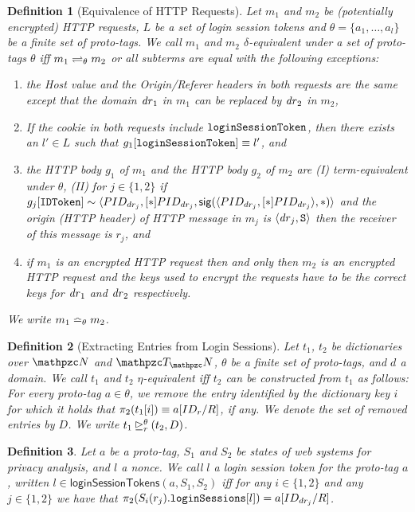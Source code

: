 \documentclass[letterpaper,onecolumn,10pt]{article}
\newtheorem{definition}{Definition}
\begin{document}
\begin{definition}[Equivalence of HTTP Requests]
  Let $m_1$ and $m_2$ be (potentially encrypted) HTTP requests, 
  $L$ be a set of login session tokens and
  $\theta = \{a_1, \ldots, a_l \}$ be a finite set of proto-tags. 
  We call $m_1$ and $m_2$ \emph{$\delta$-equivalent under a set of proto-tags $\theta$} 
  iff $m_1 \prototagequiv{\theta} m_2$ or all subterms are equal with the following exceptions:
  \begin{enumerate}
  \item the Host value and the Origin/Referer headers in both requests
    are the same except that the domain $\mi{dr}_1$ in $m_1$ can be
    replaced by $\mi{dr}_2$ in $m_2$,
  \item If the cookie in both requests include $\str{loginSessionToken}$, 
    then there exists an $l' \in L$ such that $g_1[\str{loginSessionToken}] \equiv l'$, and
  \item the HTTP body $g_1$ of $m_1$ and the HTTP body $g_2$ of $m_2$
    are (I) term-equivalent under $\theta$, 
    (II) for $j\in \{1,2\}$ if
    $g_j[\str{IDToken}] \sim \myangle{PID_{dr_j}, [*]PID_{dr_j}, 
    \sig{\myangle{PID_{dr_j}, [*]PID_{dr_j}}}{*}}$
    and the origin (HTTP header) of HTTP message in $m_j$ is
    $\an{\mi{dr}_j,\https}$ then the receiver of this message is
    $r_j$, and 
  \item if $m_1$ is an encrypted HTTP request then and only then $m_2$
    is an encrypted HTTP request and the keys used to encrypt the
    requests have to be the correct keys for $\mi{dr}_1$ and
    $\mi{dr}_2$ respectively.
  \end{enumerate}
  We write $m_1 \httptagequiv{\theta} m_2$.
\end{definition}

\begin{definition}[Extracting Entries from Login Sessions]
  Let $t_1$, $t_2$ be dictionaries over $\nonces$ and $\terms$,
  $\theta$ be a finite set of proto-tags, and $d$ a domain. We call
  $t_1$ and $t_2$ \emph{$\eta$-equivalent} iff $t_2$ can be
  constructed from $t_1$ as follows: For every proto-tag
  $a \in \theta$, we remove the entry identified by the dictionary key
  $i$ for which it holds that $\proj{2}{t_1[i]} \equiv a[ID_r/ R]$, if
  any. We denote the set of removed entries by $D$. We write
  $\logsessminus{t_1}{t_2}{\theta}{r}{D}$.
\end{definition}

\begin{definition}
  Let $a$ be a proto-tag, $S_1$ and $S_2$ be states of \uppresso web
  systems for privacy analysis, and $l$ a nonce. We call $l$ a login
  session token for the proto-tag $a$, written
  $l \in \mathsf{loginSessionTokens}(a,S_1,S_2)$ iff for any
  $i \in \{1,2\}$ and any $j \in \{1,2\}$ we have that
  $\proj{2}{S_i(r_j).\str{loginSessions}[l]} = a[ID_{dr_j}/ R]$.
\end{definition}
\end{document}
